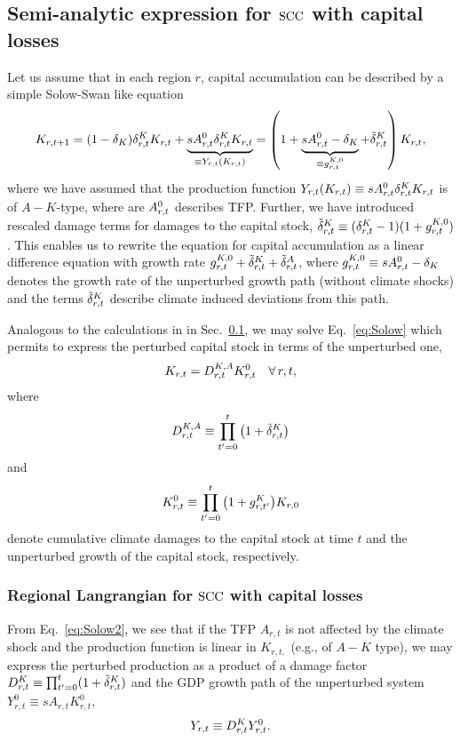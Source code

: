 \documentclass[preprint,3p,authoryear]{elsarticle}
\begin{document}
\subsection{Semi-analytic expression for $\operatorname{SCC}$ with capital losses}
\label{subsec:analytSCC}
Let us assume that in each region $r$, capital accumulation can be described by a simple Solow-Swan like equation
  \begin{equation}
  \label{eq:Solow}
    K_{r,t+1} = (1-\delta_K)\delta^K_{r,t}K_{r,t}+\underbrace{sA^{0}_{r,t}\delta^K_{r,t}K_{r,t}}_{\equiv Y_{r,t}(K_{r,t})}
    = \left(1+\underbrace{sA^{0}_{r,t}-\delta_K}_{\equiv g^{K,0}_{r,t}} +\tilde{\delta}^K_{r,t}\right)K_{r,t},
  \end{equation}
  where we have assumed that the production function $Y_{r,t}(K_{r,t})\equiv s A^{0}_{r,t}\delta^K_{r,t}K_{r,t}$ is of $A-K$-type, where are $A^{0}_{r,t}$ describes TFP. Further, we have introduced  rescaled damage terms for damages to the capital stock, $\tilde{\delta}^K_{r,t}\equiv(\delta^K_{r,t}-1)(1+g^{K,0}_{r,t})$. This enables us to rewrite the equation for capital accumulation as a linear difference equation with growth rate  $g^{K,0}_{r,t}+\tilde{\delta}^K_{r,t}+\tilde{\delta}^A_{r,t}$, where $g^{K,0}_{r,t}\equiv sA^{0}_{r,t}-\delta_K $ denotes the growth rate of the unperturbed growth path (without climate shocks) and the terms $\tilde{\delta}^K_{r,t}$ describe climate induced deviations from this path.

Analogous to the calculations in in Sec.~\ref{subsec:analytSCC}, we may solve Eq.~\eqref{eq:Solow} which permits to express the perturbed capital stock in terms of the unperturbed one,
\begin{equation}
  \label{eq:Solow2}
  K_{r,t}=D^{K,A}_{r,t}K^0_{r,t}\quad\forall\,r,t,
\end{equation}
where
\begin{equation}
  \label{eq:D}
  D^{K,A}_{r,t}\equiv\prod_{t'=0}^{t}\left(1+\tilde{\delta}^K_{r,t}\right)
\end{equation}
and
\begin{equation}
  \label{eq:YNull}
 K^0_{r,t}\equiv\prod_{t'=0}^{t} \big(1+g^{K}_{r,t'}\big)K_{r,0} 
\end{equation}
 denote cumulative climate damages to the capital stock at time $t$ and the unperturbed growth of the capital stock, respectively.

 \subsubsection{Regional Langrangian for $\operatorname{SCC}$ with capital losses}
\label{sec:LKAreg}
From Eq.~\eqref{eq:Solow2}, we see that if the TFP $A_{r,t}$ is not affected by the climate shock and the production function is linear in $K_{r,t,}$ (e.g., of $A-K$ type), we may express the perturbed production as a product of a damage factor $D^K_{r,t}\equiv\prod_{t'=0}^{t}(1+\tilde{\delta}^K_{r,t})$ and the GDP growth path of the unperturbed system $Y^{0}_{r,t}\equiv s A_{r,t}K_{r,t}^0$,
\begin{equation}
  \label{eq:GDP2}
  Y_{r,t}\equiv D^K_{r,t}Y^{0}_{r,t}.
\end{equation}
\end{document}
